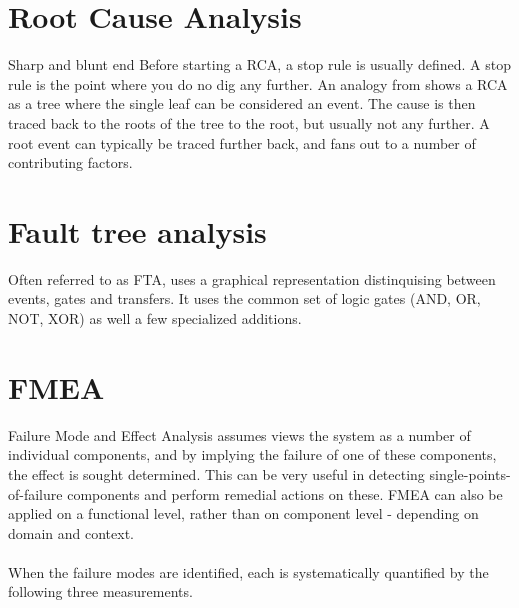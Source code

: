 \cite{hollnagel2005joint}%

\section{Root Cause Analysis}
Sharp and blunt end
Before starting a RCA, a stop rule is usually defined. A stop rule is the point where you do no dig any further. An analogy from \cite{hollnagel2004barriers} shows a RCA as a tree where the single leaf can be considered an event. The cause is then traced back to the roots of the tree to the root, but usually not any further. A root event can typically be traced further back, and fans out to a number of contributing factors.


\section{Fault tree analysis}
\label{sec:fault_tree_analysis}
Often referred to as FTA, uses a graphical representation distinquising between events, gates and transfers. It uses the common set of logic gates (AND, OR, NOT, XOR) as well a few specialized additions.

\section{FMEA}
Failure Mode and Effect Analysis assumes views the system as a number of individual components, and by implying the failure of one of these components, the effect is sought determined. This can be very useful in detecting single-points-of-failure components and perform remedial actions on these. FMEA can also be applied on a functional level, rather than on component level - depending on domain and context.\\
\\
When the failure modes are identified, each is systematically quantified by the following three measurements.

